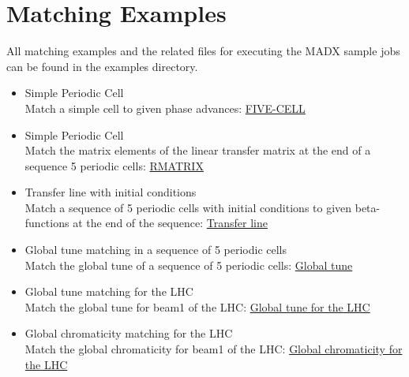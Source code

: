 


%
 
\section{Matching Examples}
\label{sec:match_examples}

All matching examples and the related files for executing the MADX
sample jobs can be found in the examples directory. 
\begin{itemize}
	\item Simple Periodic Cell\\
	Match a simple cell to given phase advances: 
        \href{http://cern.ch/madx/madX/examples/match/5cell/job.5cell.madx}{FIVE-CELL}

	\item Simple Periodic Cell\\
	Match the matrix elements of the linear transfer matrix at the
        end of a sequence 5 periodic cells:  
        \href{http://cern.ch/madx/madX/examples/match/r-matrix/job.r-matrix.madx}{RMATRIX}

	\item Transfer line with initial conditions\\
	Match a sequence of 5 periodic cells with initial conditions  to
        given beta-functions at the end of the sequence:  
        \href{http://cern.ch/madx/madX/examples/match/line/job.line.madx}{Transfer line}

	\item Global tune matching in a sequence of 5 periodic cells \\
	Match the global tune of a sequence of 5 periodic cells: 
        \href{http://cern.ch/madx/madX/examples/match/global-tune/job.global-tune.madx}{Global tune}
	
	\item Global tune matching for the LHC\\
	Match the global tune for beam1 of the LHC: 
        \href{http://cern.ch/madx/madX/examples/match/lhc.tune/job.lhc.tune.madx}{Global tune for the LHC}
	
	\item Global chromaticity matching for the LHC\\
	Match the global chromaticity for beam1 of the LHC: 
        \href{http://cern.ch/madx/madX/examples/match/lhc.chromaticity/job.lhc.chromaticity.madx}{Global
          chromaticity for the LHC} 


\end{itemize}
